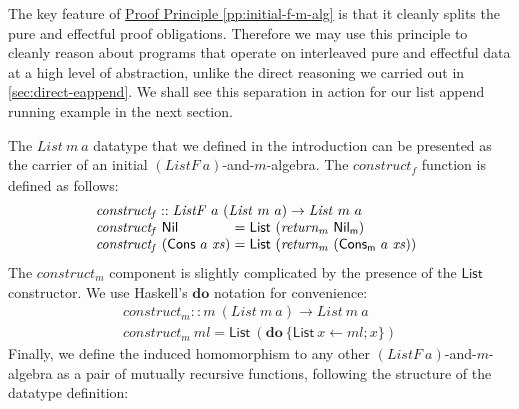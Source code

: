 \documentclass{jfp1}
\newcommand{\proofprinref}[1]{\hyperref[#1]{Proof Principle \ref*{#1}}}
\newcommand{\kw}[1]{\textbf{#1}}
\begin{document}
The key feature of \proofprinref{pp:initial-f-m-alg} is that it
cleanly splits the pure and effectful proof obligations. Therefore we
may use this principle to cleanly reason about programs that operate
on interleaved pure and effectful data at a high level of abstraction,
unlike the direct reasoning we carried out in
\autoref{sec:direct-eappend}. We shall see this separation in action
for our list append running example in the next section.

The $\mathit{List}~m~a$ datatype that we defined in the introduction
can be presented as the carrier of an initial $(\mathit{ListF}~a)$-and-$m$-algebra. The
$\mathit{construct_f}$ function is defined as follows:
\begin{displaymath}
  \begin{array}{l}
    \mathit{construct_f} :: \mathit{ListF}~a~(\mathit{List}~m~a) \to \mathit{List}~m~a \\
    \begin{array}{@{}l@{\hspace{0.3em}}c@{\hspace{0.3em}}l}
      \mathit{construct_f}~\mathsf{Nil}&=&\mathsf{List}~(\mathit{return_m}~\mathsf{Nil_m}) \\
      \mathit{construct_f}~(\mathsf{Cons}~a~\mathit{xs})&=&\mathsf{List}~(\mathit{return_m}~(\mathsf{Cons_m}~a~\mathit{xs})) \\
    \end{array}
  \end{array}
\end{displaymath}
The $\mathit{construct_m}$ component is slightly complicated by the
presence of the $\mathsf{List}$ constructor. We use Haskell's
$\kw{do}$ notation for convenience:
\begin{displaymath}
  \begin{array}{l}
    \mathit{construct_m} :: m~(\mathit{List}~m~a) \to \mathit{List}~m~a \\
    \mathit{construct_m}~\mathit{ml} = \mathsf{List}~(\kw{do}~\{ \mathsf{List}~x \leftarrow \mathit{ml}; x \})
  \end{array}
\end{displaymath}
Finally, we define the induced homomorphism to any other
$(\mathit{ListF}~a)$-and-$m$-algebra as a pair of mutually recursive
functions, following the structure of the datatype definition:
\end{document}
